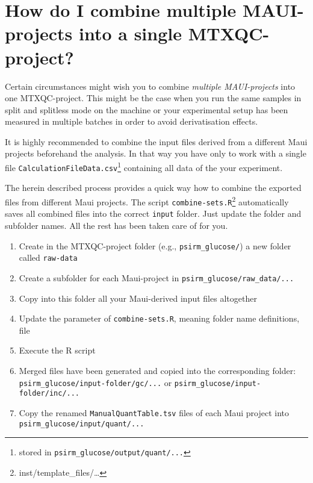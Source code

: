 \documentclass[]{book}
\providecommand{\tightlist}{%
  \setlength{\itemsep}{0pt}\setlength{\parskip}{0pt}}
\let\rmarkdownfootnote\footnote%
\def\footnote{\protect\rmarkdownfootnote}
\begin{document}
\hypertarget{multipleproj}{%
\section{How do I combine multiple MAUI-projects into a single MTXQC-project?}\label{multipleproj}}

Certain circumstances might wish you to combine \emph{multiple MAUI-projects} into one MTXQC-project. This might be the case when you run the same samples in split and splitless mode on the machine or your experimental setup has been measured in multiple batches in order to avoid derivatisation effects.

It is highly recommended to combine the input files derived from a different Maui projects beforehand the analysis. In that way you have only to work with a single file \texttt{CalculationFileData.csv}\footnote{stored in \texttt{psirm\_glucose/output/quant/...}} containing all data of the your experiment.

The herein described process provides a quick way how to combine the exported files from different Maui projects. The script \texttt{combine-sets.R}\footnote{inst/template\_files/\ldots{}} automatically saves all combined files into the correct \texttt{input} folder. Just update the folder and subfolder names. All the rest has been taken care of for you.

\begin{enumerate}
\def\labelenumi{\arabic{enumi}.}
\tightlist
\item
  Create in the MTXQC-project folder (e.g., \texttt{psirm\_glucose/}) a new folder called \texttt{raw-data}
\item
  Create a subfolder for each Maui-project in \texttt{psirm\_glucose/raw\_data/...}
\item
  Copy into this folder all your Maui-derived input files altogether
\item
  Update the parameter of \texttt{combine-sets.R}, meaning folder name definitions, file
\item
  Execute the R script
\item
  Merged files have been generated and copied into the corresponding folder: \texttt{psirm\_glucose/input-folder/gc/...} or \texttt{psirm\_glucose/input-folder/inc/...}
\item
  Copy the renamed \texttt{ManualQuantTable.tsv} files of each Maui project into \texttt{psirm\_glucose/input/quant/...}
\end{enumerate}
\end{document}
